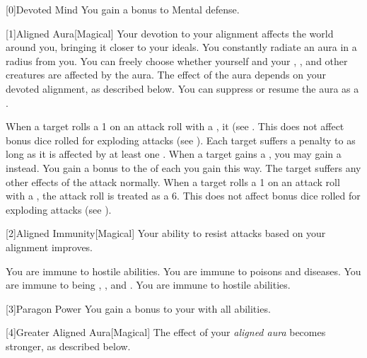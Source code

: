         [0]{Devoted Mind} You gain a  bonus to Mental defense.

        [1]{Aligned Aura}[Magical]
        Your devotion to your alignment affects the world around you, bringing it closer to your ideals.
        You constantly radiate an aura in a \areamed radius  from you.
        You can freely choose whether yourself and your , , and other creatures are affected by the aura.
        The effect of the aura depends on your devoted alignment, as described below.
        You can suppress or resume the aura as a .

         When a target rolls a 1 on an attack roll with a , it  (see .
        This does not affect bonus dice rolled for exploding attacks (see ).
         Each target suffers a  penalty to  as long as it is affected by at least one .
         When a target gains a , you may gain a  instead.
        You gain a  bonus to the  of each  you gain this way.
        The target suffers any other effects of the attack normally.
         When a target rolls a 1 on an attack roll with a , the attack roll is treated as a 6.
        This does not affect bonus dice rolled for exploding attacks (see ).

        [2]{Aligned Immunity}[Magical]
        Your ability to resist attacks based on your alignment improves.

         You are immune to hostile  abilities.
         You are immune to poisons and diseases.
         You are immune to being , , and .
         You are immune to hostile  abilities.

        [3]{Paragon Power}
        You gain a  bonus to your  with all abilities.

        [4]{Greater Aligned Aura}[Magical]
        The effect of your \textit{aligned aura} becomes stronger, as described below.

